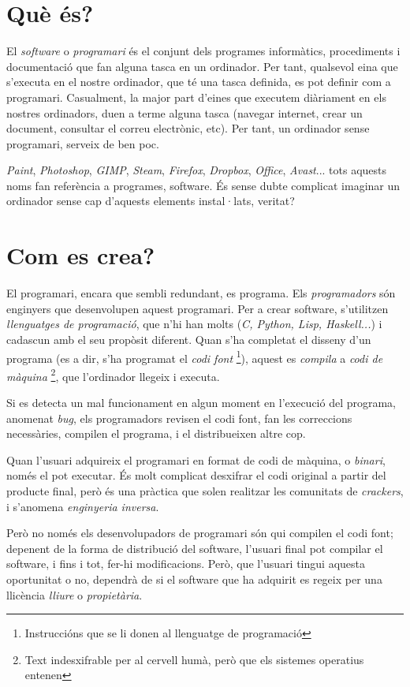 \section{Què és?}
El \emph{software} o \emph{programari} és el conjunt dels programes informàtics, procediments i documentació que fan alguna tasca en un ordinador. Per tant, qualsevol eina que s'executa en el nostre ordinador, que té una tasca definida, es pot definir com a programari. Casualment, la major part d'eines que executem diàriament en els nostres ordinadors, duen a terme alguna tasca
(navegar internet, crear un document, consultar el correu electrònic, etc). Per tant, un ordinador sense programari, serveix de ben poc.

\emph{Paint}, \emph{Photoshop}, \emph{GIMP}, \emph{Steam}, \emph{Firefox}, \emph{Dropbox}, \emph{Office}, \emph{Avast}... tots aquests noms fan referència a programes, software. És 
sense dubte complicat imaginar un ordinador sense cap d'aquests elements instal·lats, veritat?

\section{Com es crea?}
El programari, encara que sembli redundant, es programa. Els \emph{programadors}
són enginyers que desenvolupen aquest programari. Per a crear software, s'utilitzen
\emph{llenguatges de programació}, que n'hi han molts (\emph{C, Python, Lisp, Haskell...})
i cadascun amb el seu propòsit diferent. Quan s'ha completat el disseny d'un programa
(es a dir, s'ha programat el \emph{codi font} \footnote{Instruccións que se li donen al
llenguatge de programació}), aquest es \emph{compila} a \emph{codi de màquina} \footnote{Text indesxifrable per al cervell humà, però que els sistemes operatius entenen}, que l'ordinador llegeix i executa.

Si es detecta un mal funcionament en algun moment en l'execució del programa, anomenat \emph{bug}, els
programadors revisen el codi font, fan les correccions necessàries, compilen el programa,
i el distribueixen altre cop.

Quan l'usuari adquireix el programari en format de codi de màquina, o \emph{binari}, només el pot
executar. És molt complicat desxifrar el codi original a partir del producte final, però és una
pràctica que solen realitzar les comunitats de \emph{crackers}, i s'anomena \emph{enginyeria inversa}.

Però no només els desenvolupadors de programari són qui compilen el codi font; depenent de la forma
de distribució del software, l'usuari final pot compilar el software, i fins i tot, fer-hi modificacions. Però, que l'usuari tingui aquesta oportunitat o no,  dependrà de si el software que ha adquirit es regeix per una llicència \emph{lliure} o \emph{propietària}.

